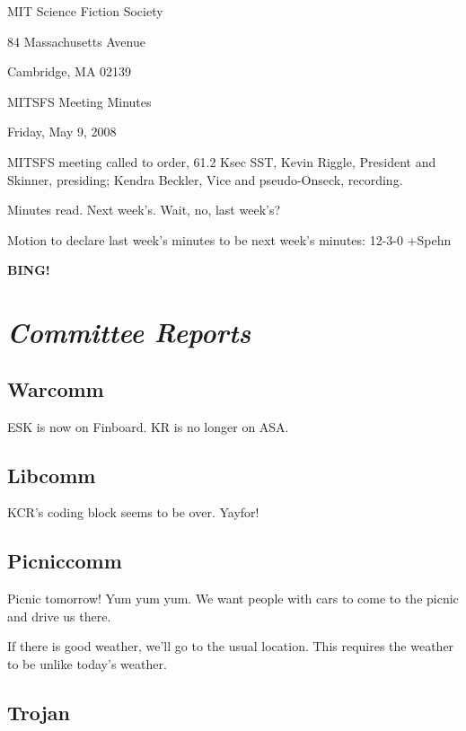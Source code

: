 \documentclass[10pt]{article}
\newcommand{\bing}{{\bf BING!} }
\newcommand{\goto}[1]{\bing \vskip 12pt \section*{{\em{#1}}}}
\begin{document}
\begin{center}

MIT Science Fiction Society

84 Massachusetts Avenue

Cambridge, MA 02139

\vspace{12pt}

MITSFS Meeting Minutes

Friday, May 9, 2008

\end{center}

\vspace{18pt}

\setlength{\parskip}{6pt}

\noindent
MITSFS meeting called to order, 61.2 Ksec SST,
Kevin Riggle, President and Skinner, presiding; Kendra Beckler, Vice and pseudo-Onseck, recording.

Minutes read.  Next week's.  Wait, no, last week's?

Motion to declare last week's minutes to be next week's minutes: 12-3-0 +Spehn

\BING

\goto{Committee Reports}

\subsection*{Warcomm}

ESK is now on Finboard.  KR is no longer on ASA.

\subsection*{Libcomm}

KCR's coding block seems to be over.  Yayfor!

\subsection*{Picniccomm}

Picnic tomorrow!  Yum yum yum.  We want people with cars to come to the picnic and drive us there.

If there is good weather, we'll go to the usual location.  This requires the weather to be unlike today's weather.

\subsection*{Trojan}
\end{document}
